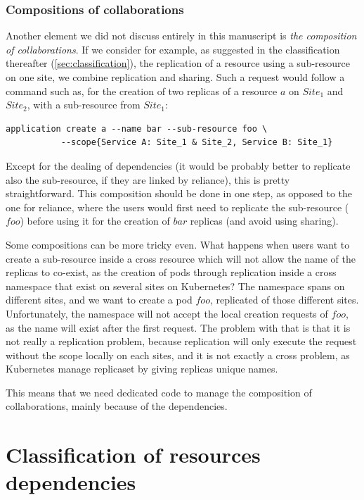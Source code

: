 \subsubsection{Compositions of collaborations}
Another element we did not discuss entirely in this manuscript is
\emph{the composition of collaborations}.
%
If we consider for example, as suggested in the classification
thereafter (\autoref{sec:classification}), the replication of a
resource using a sub-resource on one site, we combine replication and
sharing.
%
Such a request would follow a command such as, for the creation of two
replicas of a resource $a$ on $Site_1$ and $Site_2$, with a
sub-resource from $Site_1$:
\begin{lstlisting}[numbers=none]
application create a --name bar --sub-resource foo \
           --scope{Service A: Site_1 & Site_2, Service B: Site_1}
\end{lstlisting}
Except for the dealing of dependencies (it would be probably better to
replicate also the sub-resource, if they are linked by reliance), this
is pretty straightforward.
%
This composition should be done in one step, as opposed to the one for
reliance, where the users would first need to replicate the
sub-resource ($foo$) before using it for the creation of $bar$ replicas
(and avoid using sharing).
%

Some compositions can be more tricky even.
%
What happens when users want to create a sub-resource inside a cross
resource which will not allow the name of the replicas to co-exist, as
the creation of pods through replication inside a cross namespace that
exist on several sites on Kubernetes?
%
The namespace spans on different sites, and we want to create a pod
$foo$, replicated of those different sites.
%
Unfortunately, the namespace will not accept the local creation
requests of $foo$, as the name will exist after the first request.
%
The problem with that is that it is not really a replication problem,
because replication will only execute the request without the scope
locally on each sites, and it is not exactly a cross problem, as
Kubernetes manage replicaset by giving replicas unique names.

%
This means that we need dedicated code to manage the composition of
collaborations, mainly because of the dependencies.



\section{Classification of resources dependencies} %
\label{sec:classification}


